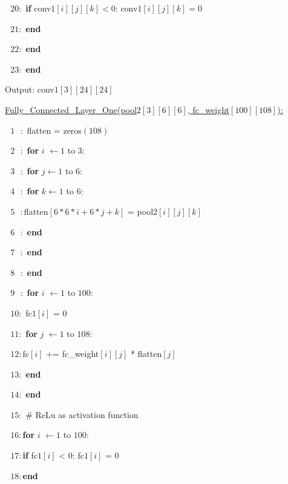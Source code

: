 \documentclass[11pt]{article}
\begin{document}
\begin{solution}
\item \qquad $\text{  } 20:$\qquad  \qquad \qquad  \textbf{ if} conv$1[i][j][k] < 0$: conv$1[i][j][k] = 0$ 
\item \qquad $\text{  } 21:$\qquad \qquad \textbf{ end}
\item \qquad $\text{  } 22:$ \qquad  \textbf{ end}
\item \qquad $\text{  } 23:$   \textbf{ end}
\item Output: conv$1[3][24][24]$
\item
 \item \qquad \underline{Fully\_Connected\_Layer\_One(pool$2[3][6][6]$, fc\_weight$[100][108]$):}
\item \qquad $\text{  } 1 \text{   }:$ flatten = zeros$(108)$
\item \qquad $\text{  } 2 \text{   }:$\textbf{ for} $i$ $\leftarrow 1$ to $3$:
\item \qquad $\text{  } 3 \text{   }:$\qquad  \textbf{ for} $j \leftarrow 1$ to $6$: 
\item \qquad $\text{  } 4 \text{   }:$\qquad  \qquad  \textbf{ for} $k \leftarrow 1$ to $6$: 
\item \qquad $\text{  } 5 \text{   }:$\qquad  \qquad \qquad flatten$[6 * 6 * i + 6 * j + k]$ = pool$2[i][j][k]$ 
\item \qquad $\text{  } 6 \text{   }:$\qquad  \qquad \textbf{ end}
\item \qquad $\text{  } 7 \text{   }:$ \qquad \textbf{ end}
\item \qquad $\text{  } 8 \text{   }:$\textbf{ end}
\item \qquad $\text{  } 9 \text{   }:$\textbf{ for} $i$ $\leftarrow 1$ to $100$:
\item \qquad $\text{  } 10:$ \qquad fc$1[i]$ = $0$ 
\item \qquad $\text{  } 11:$\qquad  \textbf{ for} $j$ $\leftarrow 1$ to $108$:
\item \qquad $\text{  } 12:$\qquad  \qquad fc$[i]$ += fc\_weight$[i][j]$ * flatten$[j]$
\item \qquad $\text{  } 13:$\qquad  \textbf{ end} 
\item \qquad $\text{  } 14:$ \textbf{end} 
\item \qquad $\text{  } 15:$ \# ReLu as activation function
\item \qquad $\text{  } 16:$\textbf{for} $i$ $\leftarrow 1$ to $100$:
\item \qquad $\text{  } 17:$\qquad \textbf{if} fc$1[i]$ < $0$: fc$1[i]$ = $0$
\item \qquad $\text{  } 18:$\qquad  \textbf{end}

\end{solution}
\end{document}
